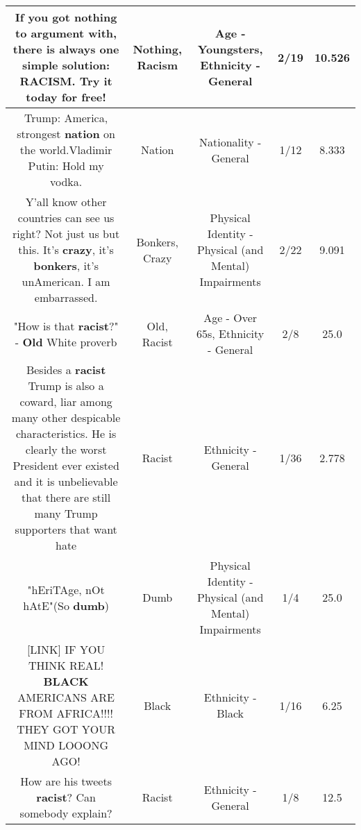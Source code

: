 \documentclass[11pt]{article}
\newlength\mylength
\begin{document}
\begin{center}
\begin{longtable}{|C{.65\mylength}|C{.30\mylength}|C{.12\mylength}|C{.12\mylength}|C{.12\mylength}|}
  \small If you got \textbf{nothing} to argument with, there is always one simple solution: \textbf{RACISM}. Try it today for free!\normalsize   & Nothing, Racism & Age - Youngsters, Ethnicity - General & 2/19 & 10.526 \\  \hline
  \small Trump: America, strongest \textbf{nation} on the world.Vladimir Putin: Hold my vodka.\normalsize   & Nation & Nationality - General & 1/12 & 8.333 \\  \hline
  \small Y'all know other countries can see us right? Not just us but this. It's \textbf{crazy}, it's \textbf{bonkers}, it's unAmerican. I am embarrassed.\normalsize   & Bonkers, Crazy & Physical Identity - Physical (and Mental) Impairments & 2/22 & 9.091 \\  \hline
  \small "How is that \textbf{racist}?" - \textbf{Old} White proverb\normalsize   & Old, Racist & Age - Over 65s, Ethnicity - General & 2/8 & 25.0 \\  \hline
  \small Besides a \textbf{racist} Trump is also a coward, liar among many other  despicable characteristics. He is clearly the worst President ever existed and it is unbelievable that there are still many Trump supporters that want hate\normalsize   & Racist & Ethnicity - General & 1/36 & 2.778 \\  \hline
  \small "hEriTAge, nOt hAtE"(So \textbf{dumb})\normalsize   & Dumb & Physical Identity - Physical (and Mental) Impairments & 1/4 & 25.0 \\  \hline
  \small  [LINK]  IF YOU THINK REAL! \textbf{BLACK} AMERICANS ARE FROM AFRICA!!!! THEY GOT YOUR MIND LOOONG AGO!\normalsize   & Black & Ethnicity - Black & 1/16 & 6.25 \\  \hline
  \small How are his tweets \textbf{racist}? Can somebody explain?\normalsize   & Racist & Ethnicity - General & 1/8 & 12.5 \\  \hline

\end{longtable}
\end{center}
\end{document}
